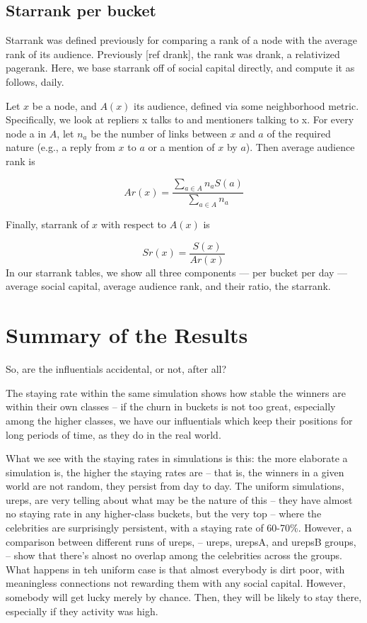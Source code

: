 \documentclass[10pt,oneside]{memoir}
\begin{document}
\subsection{Starrank per bucket}
\label{starrankperbucket}

Starrank was defined previously for comparing a rank of a node with the average rank of its audience.  Previously [ref drank], the rank was drank, a relativized pagerank.  Here, we base starrank off of social capital directly, and compute it as follows, daily.



Let $x$ be a node, and $A(x)$ its audience, defined via some neighborhood metric.  Specifically, we look at repliers x talks to and mentioners talking to x.  For every node a in $A$, let $n_a$ be the number of links between $x$ and $a$ of the required nature (e.g., a reply from $x$ to $a$ or a mention of $x$ by $a$).  Then average audience rank is

\[ Ar(x) = \frac{\sum_{a \in A} n_a S(a)}{\sum_{a \in A} n_a} \]

Finally, starrank of $x$ with respect to $A(x)$ is

\[ Sr(x) = \frac{S(x)}{Ar(x)} \]
In our starrank tables, we show all three components --- per bucket per day --- average social capital, average audience rank, and their ratio, the starrank.


\section{Summary of the Results}
\label{summaryoftheresults}

\label{sec:simulation-results}
So, are the influentials accidental, or not, after all?


The staying rate within the same simulation shows how stable the winners are within their own classes -- if the churn in buckets is not too great, especially among the higher classes, we have our influentials which keep their positions for long periods of time, as they do in the real world.


What we see with the staying rates in simulations is this: the more elaborate a simulation is, the higher the staying rates are -- that is, the winners in a given world are not random, they persist from day to day.  The uniform simulations, ureps, are very telling about what may be the nature of this -- they have almost no staying rate in any higher-class buckets, but the very top -- where the celebrities are surprisingly persistent, with a staying rate of 60-70\%.  However, a comparison between different runs of ureps, -- ureps, urepsA, and urepsB groups, -- show that there's alnost no overlap among the celebrities across the groups.  What happens in teh uniform case is that almost everybody is dirt poor, with meaningless connections not rewarding them with any social capital.  However, somebody will get lucky merely by chance.  Then, they will be likely to stay there, especially if they activity was high.
\end{document}
